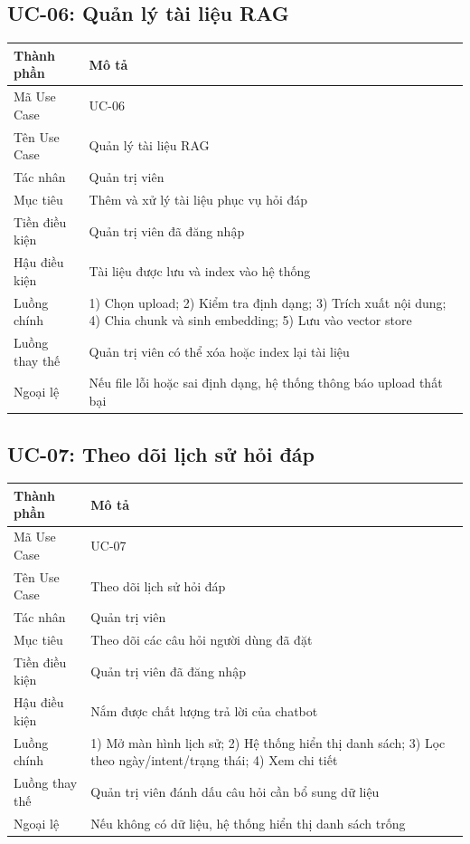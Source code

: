 \documentclass[12pt,a4paper]{report}
\begin{document}
\subsection{UC-06: Quản lý tài liệu RAG}
\begin{table}[H]
\centering
\begin{tabular}{|p{3.5cm}|p{8.5cm}|}
\hline
\textbf{Thành phần} & \textbf{Mô tả} \\ \hline
Mã Use Case & UC-06 \\ \hline
Tên Use Case & Quản lý tài liệu RAG \\ \hline
Tác nhân & Quản trị viên \\ \hline
Mục tiêu & Thêm và xử lý tài liệu phục vụ hỏi đáp \\ \hline
Tiền điều kiện & Quản trị viên đã đăng nhập \\ \hline
Hậu điều kiện & Tài liệu được lưu và index vào hệ thống \\ \hline
Luồng chính & 1) Chọn upload; 2) Kiểm tra định dạng; 3) Trích xuất nội dung; 4) Chia chunk và sinh embedding; 5) Lưu vào vector store \\ \hline
Luồng thay thế & Quản trị viên có thể xóa hoặc index lại tài liệu \\ \hline
Ngoại lệ & Nếu file lỗi hoặc sai định dạng, hệ thống thông báo upload thất bại \\ \hline
\end{tabular}
\end{table}

\subsection{UC-07: Theo dõi lịch sử hỏi đáp}
\begin{table}[H]
\centering
\begin{tabular}{|p{3.5cm}|p{8.5cm}|}
\hline
\textbf{Thành phần} & \textbf{Mô tả} \\ \hline
Mã Use Case & UC-07 \\ \hline
Tên Use Case & Theo dõi lịch sử hỏi đáp \\ \hline
Tác nhân & Quản trị viên \\ \hline
Mục tiêu & Theo dõi các câu hỏi người dùng đã đặt \\ \hline
Tiền điều kiện & Quản trị viên đã đăng nhập \\ \hline
Hậu điều kiện & Nắm được chất lượng trả lời của chatbot \\ \hline
Luồng chính & 1) Mở màn hình lịch sử; 2) Hệ thống hiển thị danh sách; 3) Lọc theo ngày/intent/trạng thái; 4) Xem chi tiết \\ \hline
Luồng thay thế & Quản trị viên đánh dấu câu hỏi cần bổ sung dữ liệu \\ \hline
Ngoại lệ & Nếu không có dữ liệu, hệ thống hiển thị danh sách trống \\ \hline
\end{tabular}
\end{table}
\end{document}
